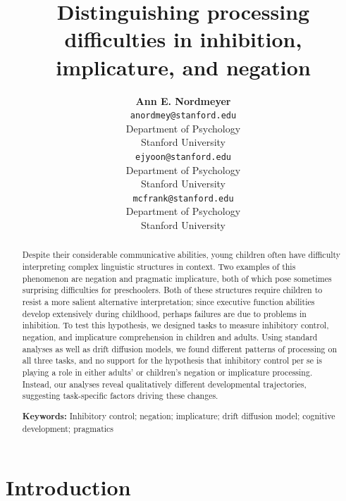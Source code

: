 \documentclass[10pt,letterpaper]{article}
\title{Distinguishing processing difficulties in inhibition, implicature, and negation}
\author{{\large \bf Ann E. Nordmeyer} \\
 \texttt{anordmey@stanford.edu} \\
 Department of Psychology \\
 Stanford University
 \And {\large \bf Erica J. Yoon} \\
 \texttt{ejyoon@stanford.edu} \\
 Department of Psychology \\
 Stanford University
 \And {\large \bf Michael C. Frank} \\
 \texttt{mcfrank@stanford.edu} \\
 Department of Psychology \\
 Stanford University}
\newcommand{\ejy}[1]{\textcolor{Blue}{[ejy: #1]}}
\newcommand{\aen}[1]{\textcolor{DarkOrange}{[aen: #1]}}
\begin{document}
\maketitle


\begin{abstract}

Despite their considerable communicative abilities, young children often have difficulty interpreting complex linguistic structures in context. Two examples of this phenomenon are negation and pragmatic implicature, both of which pose sometimes surprising difficulties for preschoolers. Both of these structures require children to resist a more salient alternative interpretation; since executive function abilities develop extensively during childhood, perhaps failures are due to problems in inhibition. To test this hypothesis, we designed tasks to measure inhibitory control, negation, and implicature comprehension in children and adults. Using standard analyses as well as drift diffusion models, we found different patterns of processing on all three tasks, and no support for the hypothesis that inhibitory control per se is playing a role in either adults' or children's negation or implicature processing. Instead, our analyses reveal qualitatively different developmental trajectories, suggesting task-specific factors driving these changes.

\textbf{Keywords:}
Inhibitory control; negation; implicature; drift diffusion model; cognitive development; pragmatics
\end{abstract}


\section{Introduction}

%
%
\end{document}

